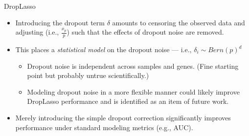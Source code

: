 \documentclass{beamer}
\begin{document}

\begin{frame}{DropLasso}

\begin{itemize}
  \itemsep12pt
  \item Introducing the dropout term $\delta$ amounts to censoring the observed
    data and adjusting (i.e., $\frac{x_p}{p}$) such that the effects of dropout
    noise are removed.
  \item This places a \textit{statistical model} on the dropout noise --- i.e.,
    $\delta_i \sim Bern(p)^d$
    \begin{itemize}
      \item Dropout noise is independent across samples and genes. (Fine
        starting point but probably untrue scientifically.)
      \item Modeling dropout noise in a more flexible manner could likely
        improve DropLasso performance and is identified as an item of future
        work.
    \end{itemize}
  \item Merely introducing the simple dropout correction significantly improves
    performance under standard modeling metrics (e.g., AUC).
\end{itemize}

\end{frame}

\end{document}
